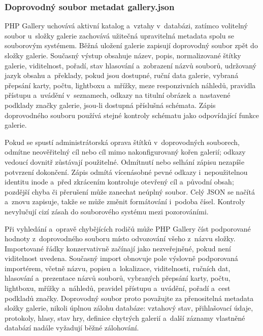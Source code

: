 \documentclass[11pt,a4paper]{article}
\newcommand{\filepath}[1]{\path{#1}}
\begin{document}
\subsubsection{Doprovodný soubor metadat gallery.json}

PHP Gallery uchovává aktivní katalog a~vztahy v~databázi, zatímco volitelný
soubor \filepath{gallery.json} u~složky galerie zachovává užitečná upravitelná
metadata spolu se souborovým systémem. Běžná uložení galerie zapisují doprovodný
soubor zpět do složky galerie. Současný výstup obsahuje název, popis,
normalizované štítky galerie, viditelnost, pořadí, stav hlasování a~zobrazení
názvů souborů, udržovaný jazyk obsahu a~překlady, pokud jsou dostupné, ruční
data galerie, vybraná přepsání karty, počtu, lightboxu a~mřížky, meze
responzivních náhledů, pravidla přístupu a~uvádění v~seznamech, odkazy na
titulní obrázek a~nastavené podklady značky galerie, jsou-li dostupná příslušná
schémata. Zápis doprovodného souboru používá stejné kontroly schématu jako
odpovídající funkce galerie.

Pokud se spustí administrátorská oprava štítků v~doprovodných souborech,
odmítne neověřitelný cíl nebo cíl mimo nakonfigurovaný kořen galerií; odkazy
vedoucí dovnitř zůstávají použitelné. Odmítnutí nebo selhání zápisu nezapíše
potvrzení dokončení. Zápis odmítá vícenásobné pevné odkazy i~nepoužitelnou
identitu inode a~před zkrácením kontroluje otevřený cíl a~původní obsah;
pozdější chyba či přerušení může zanechat neúplný soubor. Celý JSON se načítá
a~znovu zapisuje, takže se může změnit formátování i~podoba čísel. Kontroly
nevylučují cizí zásah do souborového systému mezi pozorováními.

Při vyhledání a~opravě chybějících rodičů může PHP Gallery číst podporované
hodnoty z~doprovodného souboru místo odvozování všeho z~názvu složky.
Importované řádky konzervativně začínají jako nezveřejněné, pokud není
viditelnost uvedena. Současný import obnovuje pole výslovně podporovaná
importérem, včetně názvu, popisu a~lokalizace, viditelnosti, ručních dat,
hlasování a~prezentace názvů souborů, vybraných přepsání karty, počtu,
lightboxu, mřížky a~náhledů, pravidel přístupu a~uvádění, pořadí a~cest podkladů
značky. Doprovodný soubor proto považujte za přenositelná metadata složky
galerie, nikoli úplnou zálohu databáze: vztahový stav, přihlašovací údaje,
protokoly, hlasy, stav hry, definice chytrých galerií a~další záznamy vlastněné
databází nadále vyžadují běžné zálohování.
\end{document}
